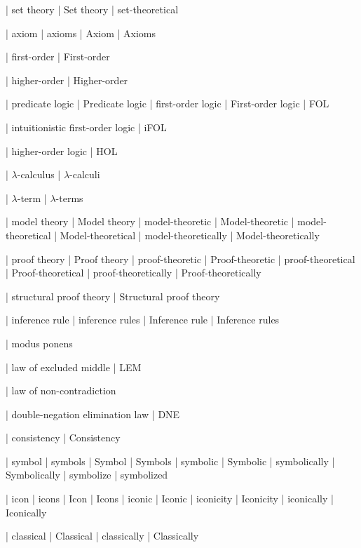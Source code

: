  | set theory
 | Set theory
 | set-theoretical

 | axiom
 | axioms
 | Axiom
 | Axioms

 | first-order
 | First-order

 | higher-order
 | Higher-order

 | predicate logic
 | Predicate logic
 | first-order logic
 | First-order logic
 | FOL

 | intuitionistic first-order logic
 | iFOL
 
 | higher-order logic
 | HOL

 | $\lambda$-calculus
 | $\lambda$-calculi
 
 | $\lambda$-term
 | $\lambda$-terms

 | model theory
 | Model theory
 | model-theoretic
 | Model-theoretic
 | model-theoretical
 | Model-theoretical
 | model-theoretically
 | Model-theoretically

 | proof theory
 | Proof theory
 | proof-theoretic
 | Proof-theoretic
 | proof-theoretical
 | Proof-theoretical
 | proof-theoretically
 | Proof-theoretically

 | structural proof theory
 | Structural proof theory

 | inference rule
 | inference rules
 | Inference rule
 | Inference rules

 | modus ponens

 | law of excluded middle
 | LEM

 | law of non-contradiction

 | double-negation elimination law
 | DNE

 | consistency
 | Consistency

 | symbol
 | symbols
 | Symbol
 | Symbols
 | symbolic
 | Symbolic
 | symbolically
 | Symbolically
 | symbolize
 | symbolized

 | icon
 | icons
 | Icon
 | Icons
 | iconic
 | Iconic
 | iconicity
 | Iconicity
 | iconically
 | Iconically
 
 | classical
 | Classical
 | classically
 | Classically


